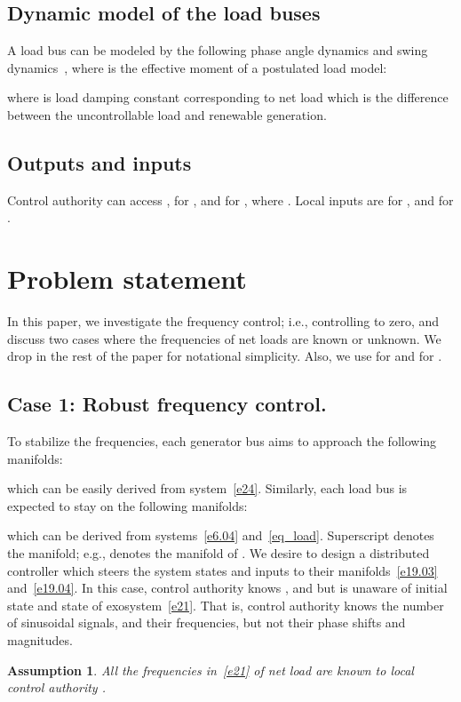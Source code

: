 \documentclass[journal]{IEEEtran}
\newtheorem{assumption}{\bf Assumption}[section]
\begin{document}
\subsection{Dynamic model of the load buses}
A load bus  can be modeled by the following phase angle dynamics and swing dynamics~\cite{ilic2010modeling}, where  is the effective moment of a postulated load model:

where  is load damping constant corresponding to net load which is the difference between the uncontrollable load and renewable generation.

\subsection{Outputs and inputs}\label{sec:outcon}
Control authority  can access ,  for , and  for , where . Local inputs are  for , and  for .

\section{Problem statement}\label{sec:controller}
In this paper, we investigate the frequency control; i.e., controlling  to zero, and discuss two cases where the frequencies  of net loads are known or unknown.
We drop  in the rest of the paper for notational simplicity. Also, we use  for  and  for . 


\subsection{Case 1: Robust frequency control.}\label{sec:formulation}
To stabilize the frequencies, each generator bus  aims to approach the following manifolds:

which can be easily derived from system~\eqref{e24}.
Similarly, each load bus  is expected to stay on the following manifolds:

which can be derived from systems~\eqref{e6.04} and~\eqref{eq_load}.
Superscript  denotes the manifold; e.g.,  denotes the manifold of .
We desire to design a distributed controller which steers the system states and inputs to their manifolds~\eqref{e19.03} and~\eqref{e19.04}.
In this case, 
control authority  knows ,  and  but is unaware of initial state  and state  of exosystem~\eqref{e21}. That is, control authority  knows the number of sinusoidal signals, and their frequencies, but not their phase shifts and magnitudes.
\begin{assumption}
All the frequencies  in~\eqref{e21} of net load  are known to local control authority .
\label{atsm1}
\end{assumption}
\end{document}
